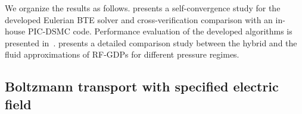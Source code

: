 We organize the results as follows.  presents a self-convergence study for the developed Eulerian BTE solver and cross-verification comparison with an in-house PIC-DSMC code. Performance evaluation of the developed algorithms is presented in~.  presents a detailed comparison study between the hybrid and the fluid approximations of RF-GDPs for different pressure regimes. 

\subsection{Boltzmann transport with specified electric field}
\label{subsec:results_specified_E}

